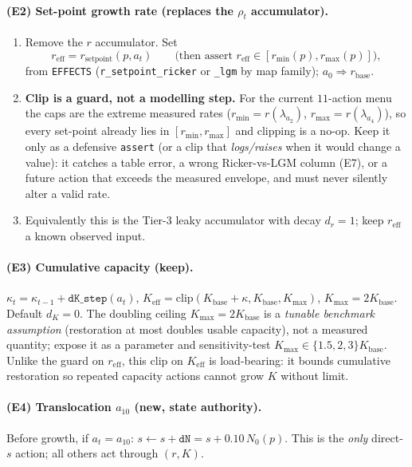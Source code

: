 \documentclass[11pt]{article}
\newcommand{\reff}{r_{\mathrm{eff}}}
\newcommand{\Keff}{K_{\mathrm{eff}}}
\newcommand{\rbase}{r_{\mathrm{base}}}
\newcommand{\Kbase}{K_{\mathrm{base}}}
\newcommand{\rmax}{r_{\max}}
\newcommand{\rmin}{r_{\min}}
\newcommand{\Kmax}{K_{\max}}
\newcommand{\code}[1]{\texttt{#1}}
\begin{document}
\paragraph{(E2) Set-point growth rate (replaces the $\rho_t$ accumulator).}
\begin{enumerate}[leftmargin=1.8em,nosep]
\item Remove the $r$ accumulator. Set
\[
\reff
=r_{\mathrm{setpoint}}(p,a_t)
\qquad\text{(then assert }\reff\in[\rmin(p),\rmax(p)]\text{)},
\]
from \code{EFFECTS} (\texttt{r\_setpoint\_}\allowbreak\texttt{ricker} or
\code{\_lgm} by map family);
$a_0\Rightarrow\rbase$.
\item \textbf{Clip is a guard, not a modelling step.} For the current $11$-action
menu the caps are the extreme measured rates ($\rmin{=}r(\lambda_{a_2})$,
$\rmax{=}r(\lambda_{a_4})$), so every set-point already lies in $[\rmin,\rmax]$ and
clipping is a no-op. Keep it only as a defensive \code{assert} (or a clip that
\emph{logs/raises} when it would change a value): it catches a table error, a wrong
Ricker-vs-LGM column (E7), or a future action that exceeds the measured envelope, and
must never silently alter a valid rate.
\item Equivalently this is the Tier-3 leaky accumulator with decay $d_r{=}1$; keep
$\reff$ a known observed input.
\end{enumerate}

\paragraph{(E3) Cumulative capacity (keep).}
$\kappa_t=\kappa_{t-1}+\code{dK\_step}(a_t)$, $\Keff=\mathrm{clip}(\Kbase+\kappa,\Kbase,\Kmax)$,
$\Kmax{=}2\Kbase$. Default $d_K{=}0$. The doubling ceiling $\Kmax{=}2\Kbase$ is a
\emph{tunable benchmark assumption} (restoration at most doubles usable capacity), not
a measured quantity; expose it as a parameter and sensitivity-test
$\Kmax\in\{1.5,2,3\}\Kbase$. Unlike the guard on $\reff$, this clip on $\Keff$ is
load-bearing: it bounds cumulative restoration so repeated capacity actions cannot grow
$K$ without limit.

\paragraph{(E4) Translocation $a_{10}$ (new, state authority).}
Before growth, if $a_t{=}a_{10}$: $s\leftarrow s+\code{dN}=s+0.10\,N_0(p)$. This is
the \emph{only} direct-$s$ action; all others act through $(r,K)$.
\end{document}
